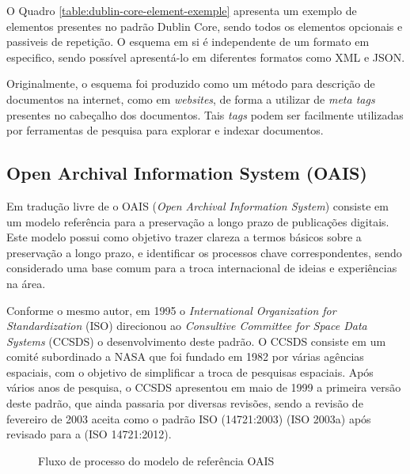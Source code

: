 O Quadro \ref{table:dublin-core-element-exemple} apresenta um exemplo de
elementos presentes no padrão Dublin Core, sendo todos os elementos opcionais
e passiveis de repetição. O esquema em si é independente de um formato em especifico, sendo
possível apresentá-lo em diferentes formatos como XML e JSON.

Originalmente, o esquema foi produzido como um método para descrição de
documentos na internet, como em \emph{websites}, de forma a utilizar de
\emph{meta tags} presentes no cabeçalho dos documentos. Tais \emph{tags}
podem ser facilmente utilizadas por ferramentas de pesquisa para explorar
e indexar documentos.

\subsection{Open Archival Information System (OAIS)}

Em tradução livre de \cite{2007:Borghoff} o OAIS
(\emph{Open Archival Information System}) consiste em um
modelo referência para a preservação a longo prazo de publicações
digitais. Este modelo possui como objetivo trazer clareza a termos
básicos sobre a preservação a longo prazo, e identificar os processos
chave correspondentes, sendo considerado uma base comum para a troca
internacional de ideias e experiências na área.

Conforme o mesmo autor, em 1995 o \emph{International Organization for Standardization} (ISO)
direcionou ao \emph{Consultive Committee for Space Data Systems} (CCSDS)
o desenvolvimento deste padrão. O CCSDS consiste em um comité subordinado
a NASA que foi fundado em 1982 por várias agências espaciais, com o objetivo
de simplificar a troca de pesquisas espaciais. Após vários anos de pesquisa,
o CCSDS apresentou em maio de 1999 a primeira versão deste padrão, que ainda
passaria por diversas revisões, sendo a revisão de fevereiro de 2003
aceita como o padrão ISO (14721:2003) (ISO 2003a) após revisado para a (ISO 14721:2012).

\begin{figure}[H]
    \caption{Fluxo de processo do modelo de referência OAIS}
    \label{fig:oais-reference-model}
    \centering
\end{figure}

